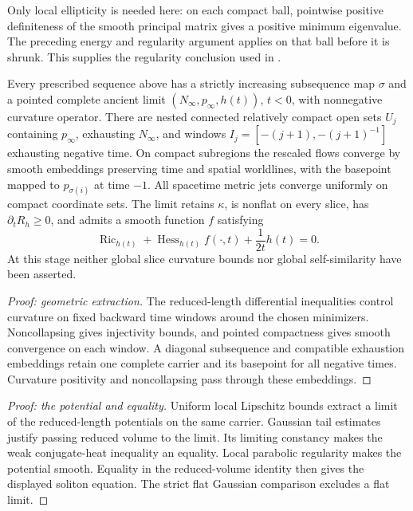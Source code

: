 Only local ellipticity is needed here: on each compact ball,
pointwise positive definiteness of the smooth principal matrix
gives a positive minimum eigenvalue.  The preceding energy and
regularity argument applies on that ball before it is shrunk.
This supplies the regularity conclusion used in
\cite[Proposition 9.20, p.~198]{MT2007}.

\begin{theorem}
\label{thm:ancient-asymptotic}
Every prescribed sequence above has a strictly increasing subsequence
map $\sigma$ and a pointed complete ancient limit
$(N_\infty,p_\infty,h(t))$, $t<0$, with nonnegative curvature operator.
There are nested connected relatively compact open sets $U_j$
containing $p_\infty$, exhausting $N_\infty$, and windows
$I_j=[-(j+1),-(j+1)^{-1}]$ exhausting negative time.
On compact subregions the rescaled flows converge by smooth embeddings
preserving time and spatial worldlines, with the basepoint mapped to
$p_{\sigma(i)}$ at time $-1$.  All spacetime metric jets converge
uniformly on compact coordinate sets.
The limit retains $\kappa$, is nonflat on every slice, has
$\partial_tR_h\geq0$, and admits a smooth function $f$ satisfying
\[
 \operatorname{Ric}_{h(t)}+\operatorname{Hess}_{h(t)}f(\cdot,t)
                          +\frac1{2t}h(t)=0.              \tag{A}
\]
At this stage neither global slice curvature bounds nor global
self-similarity have been asserted.
\end{theorem}
\begin{proof}[Proof: geometric extraction]
The reduced-length differential inequalities control curvature on fixed
backward time windows around the chosen minimizers. Noncollapsing gives
injectivity bounds, and pointed compactness gives smooth convergence on each
window. A diagonal subsequence and compatible exhaustion embeddings retain one
complete carrier and its basepoint for all negative times. Curvature
positivity and noncollapsing pass through these embeddings.
\end{proof}
\begin{proof}[Proof: the potential and equality]
Uniform local Lipschitz bounds extract a limit of the reduced-length
potentials on the same carrier. Gaussian tail estimates justify passing
reduced volume to the limit. Its limiting constancy makes the weak
conjugate-heat inequality an equality. Local parabolic regularity makes the
potential smooth. Equality in the reduced-volume identity then gives the
displayed soliton equation. The strict flat Gaussian comparison excludes a
flat limit.
\end{proof}

